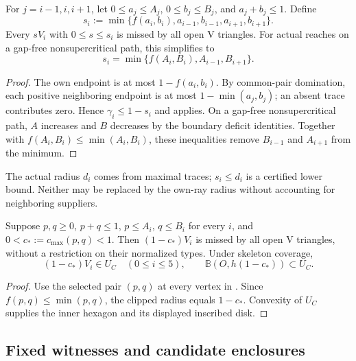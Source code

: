 \begin{corollary}
\label{cor:clipped-radial-forcing}
For $j=i-1,i,i+1$, let $0\le a_j\le A_j$, $0\le b_j\le B_j$, and
$a_j+b_j\le1$. Define
\[
 s_i:=\min\{f(a_i,b_i),a_{i-1},b_{i-1},a_{i+1},b_{i+1}\}.
\]
Every $sV_i$ with $0\le s\le s_i$ is missed by all open V triangles.
For actual reaches on a gap-free nonsupercritical path, this simplifies to
\begin{equation}
 s_i=\min\{f(A_i,B_i),A_{i-1},B_{i+1}\}.
 \label{eq:clipped-path-radius}
\end{equation}
\end{corollary}
\begin{proof}
The own endpoint is at most $1-f(a_i,b_i)$. By common-pair domination,
each positive neighboring endpoint is at most $1-\min(a_j,b_j)$;
an absent trace contributes zero. Hence $\gamma_i\le1-s_i$ and
 applies. On a gap-free
nonsupercritical path, $A$ increases and $B$ decreases by the boundary
deficit identities. Together with $f(A_i,B_i)\le\min(A_i,B_i)$, these
inequalities remove $B_{i-1}$ and $A_{i+1}$ from the minimum.
\end{proof}

The actual radius $d_i$ comes from maximal traces; $s_i\le d_i$ is a
certified lower bound. Neither may be replaced by the own-ray radius
without accounting for neighboring suppliers.

\begin{corollary}
\label{cor:new-uniform-common-pair-forcing}
Suppose $p,q\ge0$, $p+q\le1$, $p\le A_i$, $q\le B_i$ for every $i$,
and $0<c_*:=c_{\max}(p,q)<1$. Then $(1-c_*)V_i$ is missed by all
open V triangles, without a restriction on their normalized types.
Under skeleton coverage,
\[
 (1-c_*)V_i\in U_C\quad(0\le i\le5),
 \qquad \mathbb B(O,h(1-c_*))\subset U_C.
\]
\end{corollary}
\begin{proof}
Use the selected pair $(p,q)$ at every vertex in
. Since $f(p,q)\le\min(p,q)$,
the clipped radius equals $1-c_*$. Convexity of $U_C$ supplies the
inner hexagon and its displayed inscribed disk.
\end{proof}

\subsection{Fixed witnesses and candidate enclosures}
\label{subsec:trace-exact-ab-envelopes}

